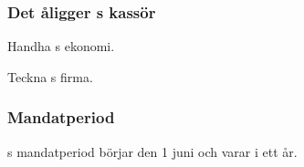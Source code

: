 \subsubsection{Det åligger \FANBARERIT{}s kassör}
\begin{att}
	\item Handha \FANBARERIT{}s ekonomi.
	\item Teckna \FANBARERIT{}s firma.
\end{att}

\subsubsection{Mandatperiod}
\FANBARERIT{}s mandatperiod börjar den 1 juni och varar i ett år.

